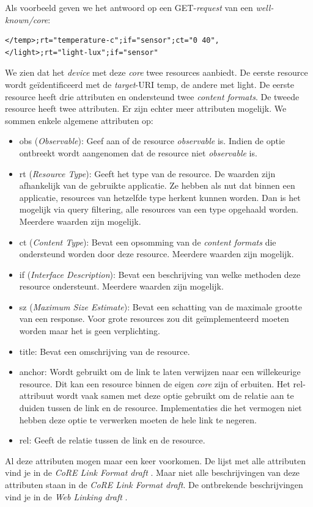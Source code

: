 \noindent
Als voorbeeld geven we het antwoord op een GET-\textit{request} van een \textit{well-known/core}:
\begin{verbatim}
</temp>;rt="temperature-c";if="sensor";ct="0 40",
</light>;rt="light-lux";if="sensor"
\end{verbatim}
We zien dat het \textit{device} met deze \textit{core} twee resources aanbiedt. De eerste resource wordt ge\"{i}dentificeerd met de \textit{target}-URI temp, de andere met light. De eerste resource heeft drie attributen en ondersteund twee \textit{content formats}. De tweede resource heeft twee attributen. Er zijn echter meer attributen mogelijk. We sommen enkele algemene attributen op:
\begin{itemize}
\item obs (\textit{Observable}): Geef aan of de resource \textit{observable} is. Indien de optie ontbreekt wordt aangenomen dat de resource niet \textit{observable} is.
\item rt (\textit{Resource Type}): Geeft het type van de resource. De waarden zijn afhankelijk van de gebruikte applicatie. Ze hebben als nut dat binnen een applicatie, resources van hetzelfde type herkent kunnen worden. Dan is het mogelijk via query filtering, alle resources van een type opgehaald worden. Meerdere waarden zijn mogelijk.
\item ct (\textit{Content Type}): Bevat een opsomming van de \textit{content formats} die ondersteund worden door deze resource. Meerdere waarden zijn mogelijk.
\item if (\textit{Interface Description}): Bevat een beschrijving van welke methoden deze resource ondersteunt. Meerdere waarden zijn mogelijk.
\item sz (\textit{Maximum Size Estimate}): Bevat een schatting van de maximale grootte van een response. Voor grote resources zou dit ge\"{i}mplementeerd moeten worden maar het is geen verplichting.
\item title: Bevat een omschrijving van de resource.
\item anchor: Wordt gebruikt om de link te laten verwijzen naar een willekeurige resource. Dit kan een resource binnen de eigen \textit{core} zijn of erbuiten. Het rel-attribuut wordt vaak samen met deze optie gebruikt om de relatie aan te duiden tussen de link en de resource. Implementaties die het vermogen niet hebben deze optie te verwerken moeten de hele link te negeren.
\item rel: Geeft de relatie tussen de link en de resource.
\end{itemize}
Al deze attributen mogen maar een keer voorkomen. De lijst met alle attributen vind je in de \textit{CoRE Link Format draft} \cite{coapDiscovery}. Maar niet alle beschrijvingen van deze attributen staan in de \textit{CoRE Link Format draft}. De ontbrekende beschrijvingen vind je in de \textit{Web Linking draft} \cite{webLinking}.

